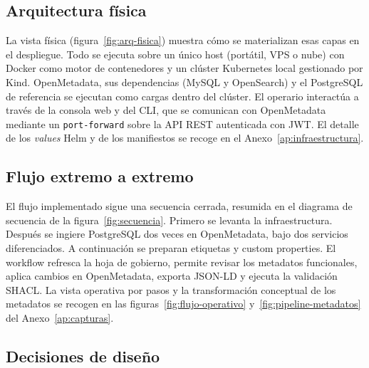 
\subsection{Arquitectura física}

La vista física (figura~\ref{fig:arq-fisica}) muestra cómo se materializan esas capas en el despliegue. Todo se ejecuta sobre un único host (portátil, VPS o nube) con Docker como motor de contenedores y un clúster Kubernetes local gestionado por Kind. OpenMetadata, sus dependencias (MySQL y OpenSearch) y el PostgreSQL de referencia se ejecutan como cargas dentro del clúster. El operario interactúa a través de la consola web y del \ac{CLI}, que se comunican con OpenMetadata mediante un \texttt{port-forward} sobre la \ac{API} \ac{REST} autenticada con \ac{JWT}. El detalle de los \emph{values} Helm y de los manifiestos se recoge en el Anexo~\ref{ap:infraestructura}.


\subsection{Flujo extremo a extremo}

El flujo implementado sigue una secuencia cerrada, resumida en el diagrama de secuencia de la figura~\ref{fig:secuencia}. Primero se levanta la infraestructura. Después se ingiere PostgreSQL dos veces en OpenMetadata, bajo dos servicios diferenciados. A continuación se preparan etiquetas y custom properties. El workflow refresca la hoja de gobierno, permite revisar los metadatos funcionales, aplica cambios en OpenMetadata, exporta JSON-LD y ejecuta la validación SHACL. La vista operativa por pasos y la transformación conceptual de los metadatos se recogen en las figuras~\ref{fig:flujo-operativo} y~\ref{fig:pipeline-metadatos} del Anexo~\ref{ap:capturas}.

\subsection{Decisiones de diseño}

